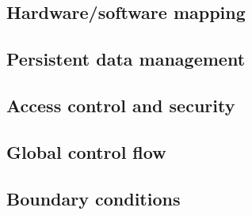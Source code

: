 \subsection{Hardware/software mapping}


\subsection{Persistent data management}


\subsection{Access control and security}

 
\subsection{Global control flow}


\subsection{Boundary conditions}

